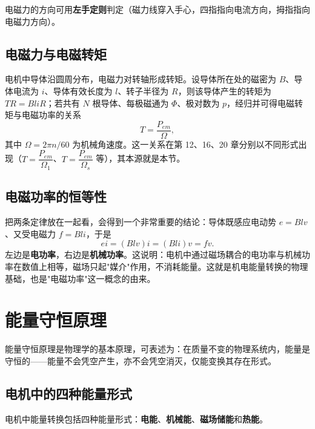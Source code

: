 
电磁力的方向可用\textbf{左手定则}判定（磁力线穿入手心，四指指向电流方向，拇指指向电磁力方向）。

\subsection{电磁力与电磁转矩}
电机中导体沿圆周分布，电磁力对转轴形成转矩。设导体所在处的磁密为 $B$、导体电流为 $i$、导体有效长度为 $l$、转子半径为 $R$，则该导体产生的转矩为 $TR=BliR$；若共有 $N$ 根导体、每极磁通为 $\Phi$、极对数为 $p$，经归并可得电磁转矩与电磁功率的关系
\begin{equation}
T=\frac{P_{em}}{\Omega},
\end{equation}
其中 $\Omega=2\pi n/60$ 为机械角速度。这一关系在第 12、16、20 章分别以不同形式出现（$T=\dfrac{P_{em}}{\Omega_1}$、$T=\dfrac{P_{em}}{\Omega_s}$ 等），其本源就是本节。

\subsection{电磁功率的恒等性}
把两条定律放在一起看，会得到一个非常重要的结论：导体既感应电动势 $e=Blv$、又受电磁力 $f=Bli$，于是
\begin{equation}
ei=\left(Blv\right)i=\left(Bli\right)v=fv .
\end{equation}
左边是\textbf{电功率}，右边是\textbf{机械功率}。这说明：电机中通过磁场耦合的电功率与机械功率在数值上相等，磁场只起"媒介"作用，不消耗能量。这就是机电能量转换的物理基础，也是"电磁功率"这一概念的由来。


\section{能量守恒原理}

能量守恒原理是物理学的基本原理，可表述为：在质量不变的物理系统内，能量是守恒的——能量不会凭空产生，亦不会凭空消灭，仅能变换其存在形式。

\subsection{电机中的四种能量形式}
电机中能量转换包括四种能量形式：\textbf{电能}、\textbf{机械能}、\textbf{磁场储能}和\textbf{热能}。

